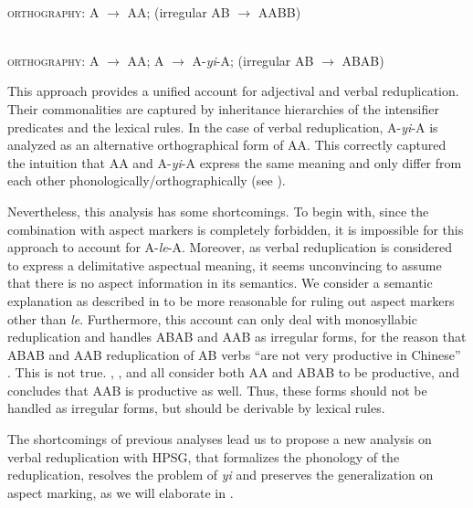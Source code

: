 \ea\label{avm:fsb-redup-a}
\\
\textsc{orthography}: A $\to$ AA; (irregular AB $\to$ AABB)
\z

\ea\label{avm:fsb-redup-v}
\\
\textsc{orthography}: A $\to$ AA; A $\to$ A-\textit{yi}-A; (irregular AB $\to$ ABAB)
\z

This approach provides a unified account for adjectival and verbal reduplication.
Their commonalities are captured by inheritance hierarchies of the intensifier predicates and the lexical rules.
In the case of verbal reduplication, A-\textit{yi}-A is analyzed as an alternative orthographical form of AA.
This correctly captured the intuition that AA and A-\textit{yi}-A express the same meaning and only differ from each other phonologically/orthographically (see ).

Nevertheless, this analysis has some shortcomings.
To begin with, since the combination with aspect markers is completely forbidden, it is impossible for this approach to account for A\hyp{}\textit{le}\hyp{}A.
Moreover, as verbal reduplication is  considered to express a delimitative aspectual meaning,
it seems unconvincing to assume that there is no aspect information in its semantics.
We consider a semantic explanation as described in   to be more reasonable for ruling out aspect markers other than \textit{le}.
Furthermore, this account can only deal with monosyllabic reduplication and handles ABAB and AAB as irregular forms, for the reason that ABAB and AAB reduplication of AB verbs ``are not very productive in Chinese'' \citep[102]{FanSongBond2015}.
This is not true. 
\citet[33]{Xing2000stat}, \citet[161]{BascianoMelloni2017}, \citet[329]{MelloniBasciano2018} and  \citet[Sec. 3.1]{Xie2020}  all consider both AA and ABAB to be productive,
and \citet[36]{Xing2000stat} concludes that AAB is productive as well.
Thus, these forms should not be handled as  irregular forms, but should be derivable by lexical rules.


 
 


The shortcomings of previous analyses lead us to propose a new analysis on verbal reduplication with {HPSG}, 
that formalizes the phonology of the reduplication, resolves the problem of \textit{yi} and preserves the generalization on aspect marking, 
as we will elaborate in . 

